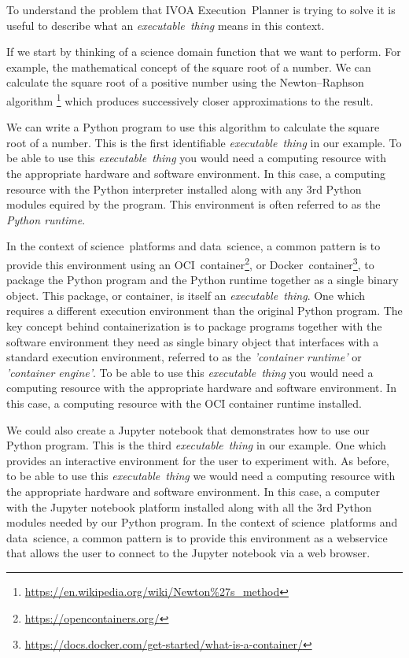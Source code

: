 \documentclass[11pt,a4paper]{ivoa}
\newcommand{\webservice} {webservice}
\newcommand{\webbrowser} {web browser}
\newcommand{\ivoa} {IVOA}
\newcommand{\executionplanner} {Execution~Planner}
\newcommand{\jupyter} {Jupyter}
\newcommand{\python} {Python}
\newcommand{\ocicontainer} {OCI~container}
\newcommand{\dockercontainer} {Docker~container}
\newcommand{\footurl}[1] {\footnote{\url{#1}}}
\newcommand{\datascience} {data~science}
\newcommand{\scienceplatform} {science~platform}
\newcommand{\executablething}  {\textit{executable~thing}}
\begin{document}
To understand the problem that \ivoa{} \executionplanner{} is trying to solve
it is useful to describe what an \executablething{} means in this context.

If we start by thinking of a science domain function that we want to perform.
For example, the mathematical concept of the square root of a number.
We can calculate the square root of a positive number using the Newton–Raphson algorithm
\footurl{https://en.wikipedia.org/wiki/Newton\%27s_method}
which produces successively closer approximations to the result.

We can write a \python{} program to use this algorithm to calculate the square root of a number.
This is the first identifiable \executablething{} in our example.
To be able to use this \executablething{} you would need a computing resource with the appropriate
hardware and software environment. In this case, a computing resource with the \python{} interpreter
installed along with any 3rd \python{} modules equired by the program.
This environment is often referred to as the \textit{\python{} runtime}.

In the context of \scienceplatform{}s and \datascience{}, a common pattern is to provide this environment
using an \ocicontainer{}\footurl{https://opencontainers.org/},
or \dockercontainer\footurl{https://docs.docker.com/get-started/what-is-a-container/},
to package the \python{} program and the \python{} runtime together as a single binary object.
This package, or container, is itself an \executablething{}. One which requires a different execution
environment than the original \python{} program.
The key concept behind containerization is to package programs together with the software environment
they need as single binary object that interfaces with a standard execution environment,
referred to as the \textit{'container runtime'} or \textit{'container engine'}.
To be able to use this \executablething{} you would need a computing resource with the appropriate
hardware and software environment. In this case, a computing resource with the OCI container runtime installed.

We could also create a \jupyter{} notebook that demonstrates how to use our \python{} program.
This is the third \executablething{} in our example.
One which provides an interactive environment for the user to experiment with.
As before, to be able to use this \executablething{} we would need a computing resource with
the appropriate hardware and software environment.
In this case, a computer with the \jupyter{} notebook platform installed along with all the 3rd \python{} modules
needed by our \python{} program.
In the context of \scienceplatform{}s and \datascience{}, a common pattern is to provide this environment as a \webservice{}
that allows the user to connect to the \jupyter{} notebook via a \webbrowser.
\end{document}
